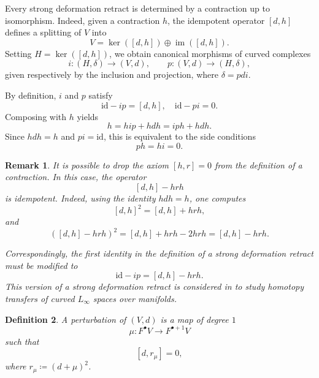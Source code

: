\documentclass[12pt]{amsart}
\newtheorem{defn}{Definition}[section]
\newtheorem{rmk}[defn]{Remark}
\numberwithin{equation}{section}
\theoremstyle{plain}
\newcommand{\id}{\mathrm{id}}
\begin{document}
	Every strong deformation retract is determined by a contraction up to isomorphism. Indeed, given a contraction $h$, the idempotent operator $[d,h]$ defines a splitting of $V$ into
	\[
	V = \ker([d,h]) \oplus \operatorname{im}([d,h]).
	\]
	Setting $H = \ker([d,h])$, we obtain canonical morphisms of curved complexes
	\[
	i \colon (H, \delta) \longrightarrow (V,d), \qquad p \colon (V,d) \longrightarrow (H, \delta),
	\]
	given respectively by the inclusion and projection, where $\delta = pdi$. 
	
	By definition, $i$ and $p$ satisfy
	\[
	\id - ip = [d,h],\quad
	\id - pi = 0.
	\]
	Composing with $h$ yields
	\[
	h = hip + hdh = iph + hdh.
	\]
	Since $hdh = h$ and $pi = \id$, this is equivalent to the side conditions
	\[
	ph = hi = 0.
	\]
	\begin{rmk}
		It is possible to drop the axiom \([h,r]=0\) from the definition of a contraction. In this case, the operator
		\[
		[d,h]-hrh
		\]
		is idempotent. Indeed, using the identity \(hdh=h\), one computes
		\[
		[d,h]^2 = [d,h] + hrh,
		\]
		and
		\[
		([d,h]-hrh)^2
		= [d,h] + hrh - 2hrh
		= [d,h]-hrh.
		\]
		
		Correspondingly, the first identity in the definition of a strong deformation retract must be modified to
		\[
		\id - ip = [d,h] - hrh.
		\]
		This version of a strong deformation retract is considered in \cite{amorim2022inverse} to study homotopy transfers of curved $L_\infty$ spaces over manifolds.
	\end{rmk}

	\begin{defn}
		A \emph{perturbation} of $(V,d)$ is a map of degree $1$
		\[
		\mu \colon F^\bullet V \longrightarrow F^{\bullet + 1} V
		\]
		such that
		\[
		[d, r_\mu]=0,
		\]
		where $r_\mu\coloneqq(d+\mu)^2$.
	\end{defn}
	
\end{document}
